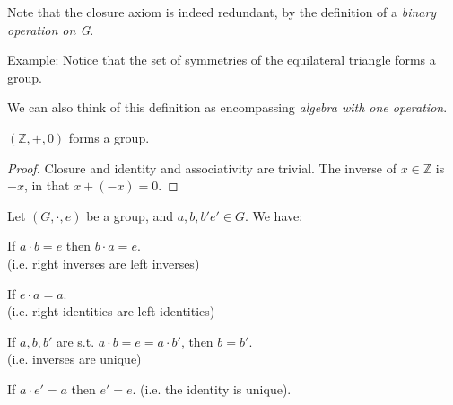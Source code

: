 \documentclass[12pt]{article}
\begin{document}
Note that the closure axiom is indeed redundant,
by the definition of a \emph{binary operation on G}.

Example: Notice that the set of symmetries of 
the equilateral triangle forms a group.

We can also think of this definition as
encompassing \emph{algebra with one operation}.

\begin{exercise}
    $(\mathbb{Z},+,0)$ forms a group.
\end{exercise}
\begin{proof}
    Closure and identity and associativity are trivial.
    The inverse of $x \in \mathbb{Z}$ is $-x$, in that $x + (-x) = 0$.
\end{proof}

\begin{theorem}
    Let $(G,\cdot,e)$ be a group, and $a,b,b'e' \in G$. We have:
    \begin{compactenum}[(i)]
    \item If $a \cdot b = e$ then $b \cdot a = e$. \\
        (i.e. right inverses are left inverses)
    \item If $e \cdot a = a$. \\
        (i.e. right identities are left identities)
    \item If $a,b,b'$ are s.t. $a \cdot b = e = a \cdot b'$,
        then $b = b'$. \\
        (i.e. inverses are unique)
    \item If $a \cdot e' = a$ then $e' = e$.
        (i.e. the identity is unique).
    \end{compactenum}
\end{theorem}
\end{document}
